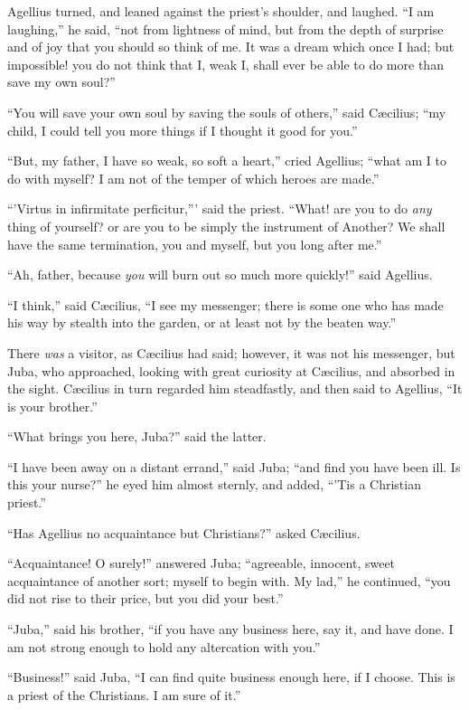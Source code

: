 Agellius turned, and leaned against the priest's shoulder, and
laughed. ``I am laughing,'' he said, ``not from lightness
of mind, but from the depth of surprise and of joy that you should so
think of me. It was a dream which once I had; but impossible! you do
not think that I, weak I, shall ever be able to do more than save my
own soul?''

``You will save your own soul by saving the souls of
others,'' said Cæcilius; ``my child, I could tell you more
things if I thought it good for you.''

``But, my father, I have so weak, so soft a heart,'' cried
Agellius; ``what am I to do with myself? I am not of the temper of
which heroes are made.''

``'Virtus in infirmitate perficitur,''' said the priest.
``What! are you to do \emph{any} thing of yourself? or are you to
be simply the instrument of Another? We shall have the same
termination, you and myself, but you long after me.''

``Ah, father, because \emph{you} will burn out so much more
quickly!'' said Agellius.

``I think,'' said Cæcilius, ``I see my messenger;
there is some one who has made his way by stealth into the garden, or
at least not by the beaten way.''

There \emph{was} a visitor, as Cæcilius had said; however, it was
not his messenger, but Juba, who approached, looking with great
curiosity at Cæcilius, and absorbed in the sight. Cæcilius in turn
regarded him steadfastly, and then said to Agellius, ``It is your
brother.''

``What brings you here, Juba?'' said the latter.

``I have been away on a distant errand,'' said Juba;
``and find you have been ill. Is this your nurse?'' he eyed
him almost sternly, and added, ``'Tis a Christian priest.''

``Has Agellius no acquaintance but Christians?'' asked
Cæcilius.

``Acquaintance! O surely!'' answered Juba; ``agreeable,
innocent, sweet acquaintance of another sort; myself to begin with. My
lad,'' he continued, ``you did not rise to their price, but
you did your best.''

``Juba,'' said his brother, ``if you have any business
here, say it, and have done. I am not strong enough to hold any
altercation with you.''

``Business!'' said Juba, ``I can find quite business
enough here, if I choose. This is a priest of the Christians. I am
sure of it.''


